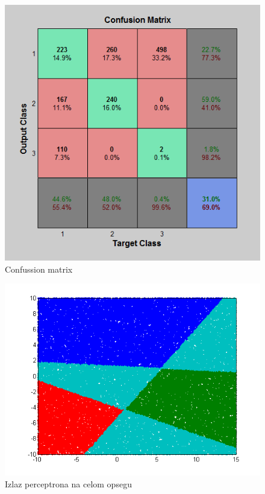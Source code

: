 \documentclass{report}
\begin{document}
\begin{enumerate}
\begin{enumerate}
\begin{figure}[!h]
\begin{center}
\includegraphics[scale=0.7]{B1confussionPerceptron.png}
\end{center}
\caption{Confussion matrix}
\end{figure}

\begin{figure}[!h]
\begin{center}
\includegraphics[scale=0.8]{B1outputPerceptronRandom50000.png}
\end{center}
\caption{Izlaz perceptrona na celom opsegu}
\end{figure}











\end{enumerate}
\end{enumerate}
\end{document}
